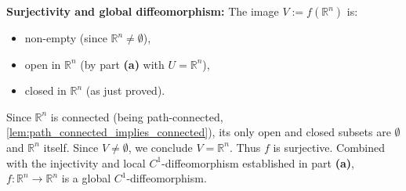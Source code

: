 \begin{exercisesolution}
\begin{enumerate}[label=\textbf{(\alph*)}]
    \textbf{Surjectivity and global diffeomorphism:} The image $V := f(\mathbb{R}^n)$ is:
    \begin{itemize}
      \item non-empty (since $\mathbb{R}^n \neq \emptyset$),
      \item open in $\mathbb{R}^n$ (by part \textbf{(a)} with $U = \mathbb{R}^n$),
      \item closed in $\mathbb{R}^n$ (as just proved).
    \end{itemize}
    Since $\mathbb{R}^n$ is connected (being path-connected, \cref{lem:path_connected_implies_connected}),
    its only open and closed subsets are $\emptyset$ and $\mathbb{R}^n$ itself. Since $V \neq \emptyset$,
    we conclude $V = \mathbb{R}^n$.
    Thus $f$ is surjective. Combined with the injectivity and local $C^1$-diffeomorphism established in
    part \textbf{(a)}, $f : \mathbb{R}^n \to \mathbb{R}^n$ is a global $C^1$-diffeomorphism.
\end{enumerate}
\end{exercisesolution}
